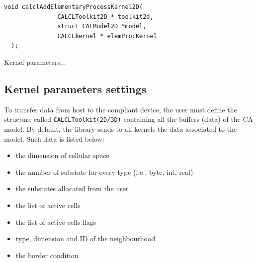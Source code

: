 \begin{lstlisting}[numbers=none]
  void calclAddElementaryProcessKernel2D(
               CALCLToolkit2D * toolkit2d,
               struct CALModel2D *model,
               CALCLkernel * elemProcKernel
  );
\end{lstlisting}


Kernel parameters...








\subsection{Kernel parameters settings}

To transfer data from host to the compliant device, the user must define
the structure called \verb'CALCLToolkit(2D/3D)' containing all the
buffers (data) of the CA model. By default, the library sends to all
kernels the data associated to the model. Such data is listed
below:

\begin{itemize}
	\item the dimension of cellular space
	\item the number of substate for every type (i.e., byte, int, real)
	\item the substates allocated from the user
	\item the list of active cells
	\item the list of active cells flags
	\item type, dimension and ID of the neighbourhood
	\item the border condition
\end{itemize}

